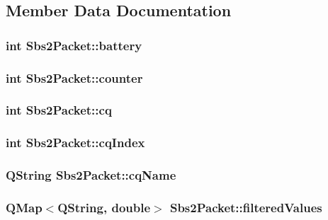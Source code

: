\subsection{Member Data Documentation}
\hypertarget{classSbs2Packet_a32fadc0b6ffe84dcba03ee3a943e1828}{
\subsubsection[{battery}]{\setlength{\rightskip}{0pt plus 5cm}int Sbs2\-Packet\-::battery}}\label{classSbs2Packet_a32fadc0b6ffe84dcba03ee3a943e1828}
\hypertarget{classSbs2Packet_af326a6f42a0486d08dbd17606ea7efaa}{
\subsubsection[{counter}]{\setlength{\rightskip}{0pt plus 5cm}int Sbs2\-Packet\-::counter}}\label{classSbs2Packet_af326a6f42a0486d08dbd17606ea7efaa}
\hypertarget{classSbs2Packet_a855c38df71a3630c692712afc686f29a}{
\subsubsection[{cq}]{\setlength{\rightskip}{0pt plus 5cm}int Sbs2\-Packet\-::cq}}\label{classSbs2Packet_a855c38df71a3630c692712afc686f29a}
\hypertarget{classSbs2Packet_aa2dc8c43674d8dde85cb5cddfb86d46d}{
\subsubsection[{cq\-Index}]{\setlength{\rightskip}{0pt plus 5cm}int Sbs2\-Packet\-::cq\-Index}}\label{classSbs2Packet_aa2dc8c43674d8dde85cb5cddfb86d46d}
\hypertarget{classSbs2Packet_a548d8e8a0a00c3885143fe66fb6bd2b9}{
\subsubsection[{cq\-Name}]{\setlength{\rightskip}{0pt plus 5cm}Q\-String Sbs2\-Packet\-::cq\-Name}}\label{classSbs2Packet_a548d8e8a0a00c3885143fe66fb6bd2b9}
\hypertarget{classSbs2Packet_a910213b186d242ecc610a5d314d6115f}{
\subsubsection[{filtered\-Values}]{\setlength{\rightskip}{0pt plus 5cm}Q\-Map$<$Q\-String, double$>$ Sbs2\-Packet\-::filtered\-Values}}\label{classSbs2Packet_a910213b186d242ecc610a5d314d6115f}
